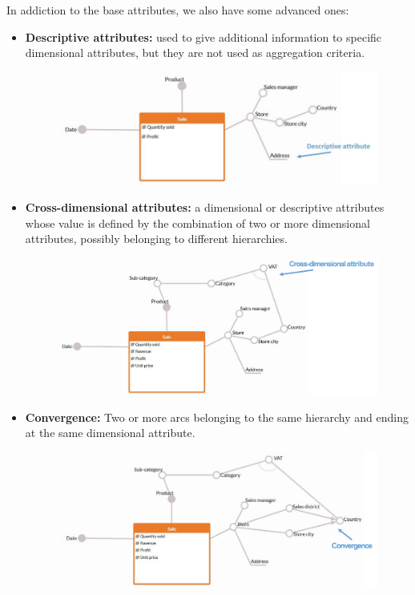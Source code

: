 In addiction to the base attributes, we also have some advanced ones:
\begin{itemize}
    \item \textbf{Descriptive attributes:} used to give additional information to specific dimensional attributes, but they are not used as aggregation criteria.
    \begin{figure}[ht!]
        \centering
        \includegraphics[scale=0.66]{images/DFM_descriptive_attributes.png}
    \end{figure}
    \item \textbf{Cross-dimensional attributes:} a dimensional or descriptive attributes whose value is defined by the combination of two or more dimensional attributes, possibly belonging to different hierarchies.
    \begin{figure}[ht!]
        \centering
        \includegraphics[scale=0.65]{images/DFM_cross_dimensional_attributes.png}
    \end{figure}
    \item \textbf{Convergence:} Two or more arcs belonging to the same hierarchy and ending at the same dimensional attribute.
    \begin{figure}[ht!]
        \centering
        \includegraphics[scale=0.65]{images/DFM_convergence.png}

\end{figure}
\end{itemize}
